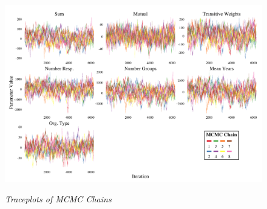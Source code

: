 \documentclass[12pt,a4paper,titlepage]{article}
\begin{document}
\begin{figure}[!ht]
\caption{\textit{Traceplots of MCMC Chains}}
\graphicspath{ {`/Users/TScott/Google\space Drive/elwha/NetworkChapter'}}
\noindent
\includegraphics[width=6.5in]
{traceplotdu}
\label{figure:traceplots}
\end{figure}
\end{document}
